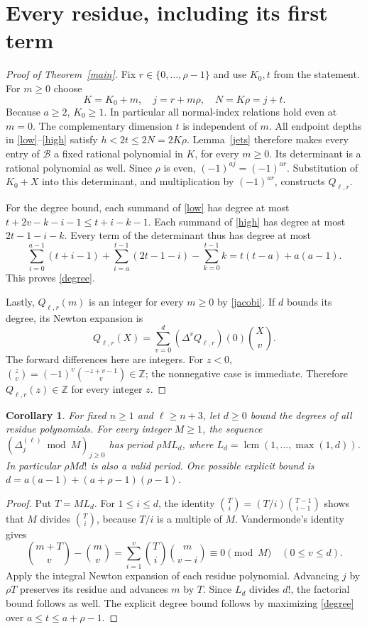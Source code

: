 \documentclass[11pt,a4paper]{article}
\newcommand{\Z}{\mathbb Z}
\newcommand{\D}[2]{\Delta_{#1}^{(#2)}}
\newtheorem{corollary}[theorem]{Corollary}
\begin{document}
\section{Every residue, including its first term}
\begin{proof}[Proof of Theorem~\ref{main}]
Fix $r\in\{0,\ldots,\rho-1\}$ and use $K_0,t$ from the statement.
For $m\ge0$ choose
\[
 K=K_0+m,\quad j=r+m\rho,\quad N=K\rho=j+t.
\]
Because $a\ge2$, $K_0\ge1$. In particular all normal-index relations
hold even at $m=0$. The complementary dimension $t$ is independent of
$m$. All endpoint depths in \eqref{low}--\eqref{high} satisfy
$h<2t\le2N=2K\rho$. Lemma~\ref{jets} therefore makes every entry of
$\mathcal B$ a fixed rational polynomial in $K$, for every $m\ge0$.
Its determinant is a rational polynomial as well. Since $\rho$ is even,
$(-1)^{aj}=(-1)^{ar}$. Substitution of $K_0+X$ into this determinant,
and multiplication by $(-1)^{ar}$, constructs $Q_{\ell,r}$.

For the degree bound, each summand of \eqref{low} has degree at most
$t+2v-k-i-1\le t+i-k-1$. Each summand of \eqref{high} has degree at
most $2t-1-i-k$. Every term of the determinant thus has degree at most
\[
 \sum_{i=0}^{a-1}(t+i-1)+\sum_{i=a}^{t-1}(2t-1-i)
 -\sum_{k=0}^{t-1}k=t(t-a)+a(a-1).
\]
This proves \eqref{degree}.

Lastly, $Q_{\ell,r}(m)$ is an integer for every $m\ge0$ by
\eqref{jacobi}. If $d$ bounds its degree, its Newton expansion is
\[
 Q_{\ell,r}(X)=\sum_{v=0}^{d}(\Delta^v Q_{\ell,r})(0)\binom Xv.
\]
The forward differences here are integers. For $z<0$,
$\binom zv=(-1)^v\binom{-z+v-1}{v}\in\Z$; the nonnegative case is
immediate. Therefore $Q_{\ell,r}(z)\in\Z$ for every integer $z$.
\end{proof}

\begin{corollary}\label{modular}
For fixed $n\ge1$ and $\ell\ge n+3$, let $d\ge0$ bound the degrees of
all residue polynomials. For every integer $M\ge1$, the sequence
$(\D j\ell\bmod M)_{j\ge0}$ has period $\rho M L_d$, where
$L_d=\operatorname{lcm}(1,\ldots,\max(1,d))$.
In particular $\rho M d!$ is also a valid period.
One possible explicit bound is
$d=a(a-1)+(a+\rho-1)(\rho-1)$.
\end{corollary}
\begin{proof}
Put $T=ML_d$. For $1\le i\le d$, the identity
$\binom Ti=(T/i)\binom{T-1}{i-1}$ shows that $M$ divides $\binom Ti$,
because $T/i$ is a multiple of $M$. Vandermonde's identity gives
\[
 \binom{m+T}{v}-\binom mv
 =\sum_{i=1}^v\binom Ti\binom m{v-i}\equiv0\pmod M
 \quad(0\le v\le d).
\]
Apply the integral Newton expansion of each residue polynomial.
Advancing $j$ by $\rho T$ preserves its residue and advances $m$ by $T$.
Since $L_d$ divides $d!$, the factorial bound follows as well.
The explicit degree bound follows by maximizing
\eqref{degree} over $a\le t\le a+\rho-1$.
\end{proof}
\end{document}
